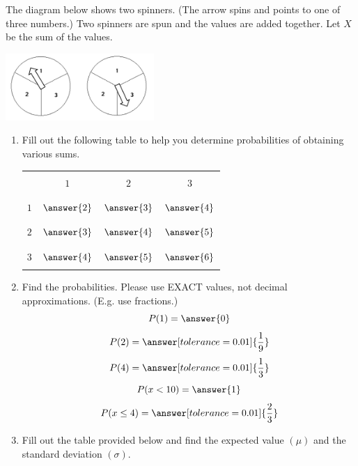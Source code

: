 \documentclass{ximera}
\begin{document}
\begin{problem}\label{prob:140hom4prob3}
The diagram below shows two spinners.  (The arrow spins and points to one of three numbers.)  Two spinners are spun and the values are added together.  Let $X$ be the sum of the values.  

\begin{image}
   
\includegraphics[height=1in]{140H4pic1.jpg}~
 
\end{image}



\begin{enumerate}
    \item Fill out the following table to help you determine probabilities of obtaining various sums.
    
\begin{center}
\begin{tabular}{|c|c|c|c|}
 \hline
 && &   \\
 & $1$& $2$ &$3$ \\
 && &   \\
  \hline
  && & \\
 $1$&$\answer{2}$&$\answer{3}$&$\answer{4}$ \\
  &&& \\
 \hline
  &&& \\
 $2$&$\answer{3}$&$\answer{4}$ &$\answer{5}$ \\
  &&& \\
 \hline
  &&& \\
  $3$&$\answer{4}$&$\answer{5}$  &$\answer{6}$ \\
  &&& \\
 \hline
 \end{tabular}
\end{center}    
    
    
\item Find the probabilities. Please use EXACT values, not decimal approximations. (E.g. use fractions.)
$$P(1)=\answer{0}$$ $$P(2)=\answer[tolerance=0.01]{\frac{1}{9}}$$ $$P(4)=\answer[tolerance=0.01]{\frac{1}{3}}$$ $$P(x<10)=\answer{1}$$ $$P(x\leq 4)=\answer[tolerance=0.01]{\frac{2}{3}}$$


\item Fill out the table provided below and find the expected value $(\mu)$ and the standard deviation $(\sigma)$.  


\end{enumerate}
\end{problem}
\end{document}

